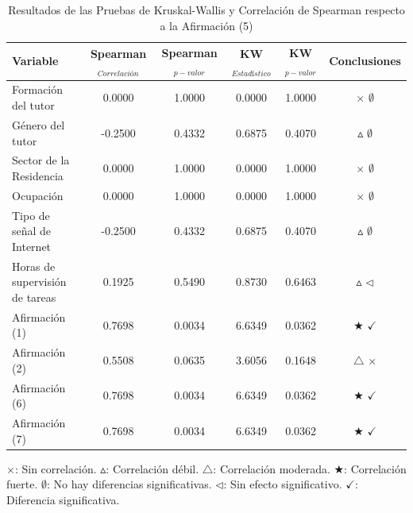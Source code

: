 \documentclass[a4paper,fleqn]{cas-sc}
\begin{document}
					\begin{table}[h!]
						\centering
						\caption{Resultados de las Pruebas de Kruskal-Wallis y Correlación de Spearman respecto a la Afirmación (5)}
						\begin{tabularx}{\textwidth}{Xccccc}
							\toprule
							\textbf{Variable} & \textbf{Spearman$_{Correlación}$} & \textbf{Spearman$_{p-valor}$} & \textbf{KW$_{Estadístico}$} & \textbf{KW$_{p-valor}$} & \textbf{Conclusiones} \\
							\midrule
							Formación del tutor & 0.0000 & 1.0000 & 0.0000 & 1.0000 & \(\times\) \(\emptyset\) \\ %
							Género del tutor & -0.2500 & 0.4332 & 0.6875 & 0.4070 & \(\vartriangle\) \(\emptyset\) \\ %
							Sector de la Residencia & 0.0000 & 1.0000 & 0.0000 & 1.0000 & \(\times\) \(\emptyset\) \\ %
							Ocupación & 0.0000 & 1.0000 & 0.0000 & 1.0000 & \(\times\) \(\emptyset\) \\ %
							Tipo de señal de Internet & -0.2500 & 0.4332 & 0.6875 & 0.4070 & \(\vartriangle\) \(\emptyset\) \\ %
							Horas de supervisión de tareas & 0.1925 & 0.5490 & 0.8730 & 0.6463 & \(\vartriangle\) \(\triangleleft\) \\ %
							Afirmación (1) & 0.7698 & 0.0034 & 6.6349 & 0.0362 & \(\bigstar\) \(\checkmark\) \\ %
							Afirmación (2) & 0.5508 & 0.0635 & 3.6056 & 0.1648 & \(\triangle\) \(\times\) \\ %
							Afirmación (6) & 0.7698 & 0.0034 & 6.6349 & 0.0362 & \(\bigstar\) \(\checkmark\) \\ %
							Afirmación (7) & 0.7698 & 0.0034 & 6.6349 & 0.0362 & \(\bigstar\) \(\checkmark\) \\ %
							\bottomrule
						\end{tabularx}
						\label{table:kruskal-spearman-results}
						\parbox{\textwidth}{\footnotesize 
							\(\times\): Sin correlación. \(\vartriangle\): Correlación débil. \(\triangle\): Correlación moderada. \(\bigstar\): Correlación fuerte. \(\emptyset\): No hay diferencias significativas.  \(\triangleleft\): Sin efecto significativo. \(\checkmark\): Diferencia significativa.
						}
					\end{table}
					
\end{document}
